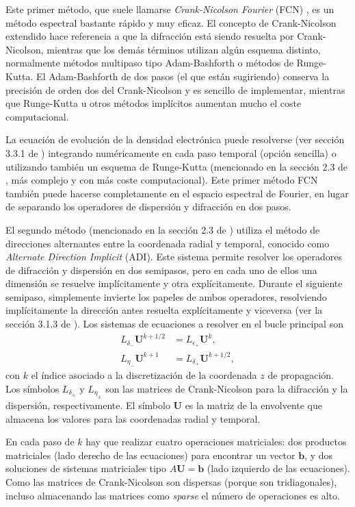 \documentclass{scrartcl} %
\begin{document}
Este primer método, que suele llamarse \emph{Crank-Nicolson Fourier} (FCN) \cite{Couairon2007}, es un método espectral bastante rápido y muy eficaz. El concepto de Crank-Nicolson extendido hace referencia a que la difracción está siendo resuelta por Crank-Nicolson, mientras que los demás términos utilizan algún esquema distinto, normalmente métodos multipaso tipo Adam-Bashforth o métodos de Runge-Kutta. El Adam-Bashforth de dos pasos (el que están sugiriendo) conserva la precisión de orden dos del Crank-Nicolson y es sencillo de implementar, mientras que Runge-Kutta u otros métodos implícitos aumentan mucho el coste computacional.

La ecuación de evolución de la densidad electrónica puede resolverse (ver sección 3.3.1 de \cite{Couairon2011}) integrando numéricamente en cada paso temporal (opción sencilla) o utilizando también un esquema de Runge-Kutta (mencionado en la sección 2.3 de \cite{Couairon2007}, más complejo y con más coste computacional). Este primer método FCN también puede hacerse completamente en el espacio espectral de Fourier, en lugar de separando los operadores de dispersión y difracción en dos pasos.

El segundo método (mencionado en la sección 2.3 de \cite{Couairon2007}) utiliza el método de direcciones alternantes entre la coordenada radial y temporal, conocido como \emph{Alternate Direction Implicit} (ADI). Este sistema permite resolver los operadores de difracción y dispersión en dos semipasos, pero en cada uno de ellos una dimensión se resuelve implícitamente y otra explícitamente. Durante el siguiente semipaso, simplemente invierte los papeles de ambos operadores, resolviendo implícitamente la dirección antes resuelta explícitamente y viceversa (ver la sección 3.1.3 de \cite{Couairon2011}). Los sistemas de ecuaciones a resolver en el bucle principal son
\begin{align}
  L_{\delta_{-}}\symbf{U}^{k + 1/2} & = L_{\epsilon_{+}}\symbf{U}^{k}, \label{eq:50} \\
  L_{\eta_{-}}\symbf{U}^{k + 1} & = L_{\delta_{+}}\symbf{U}^{k + 1/2}, \label{eq:51}
\end{align}
con $k$ el índice asociado a la discretización de la coordenada $z$ de propagación. Los símbolos $L_{\delta_{\pm}}$ y $L_{\eta_{\pm}}$ son las matrices de Crank-Nicolson para la difracción y la dispersión, respectivamente. El símbolo $\symbf{U}$ es la matriz de la envolvente que almacena los valores para las coordenadas radial y temporal.

En cada paso de $k$ hay que realizar cuatro operaciones matriciales: dos productos matriciales (lado derecho de las ecuaciones) para encontrar un vector $\symbf{b}$, y dos soluciones de sistemas matriciales tipo $A \symbf{U} = \symbf{b}$ (lado izquierdo de las ecuaciones). Como las matrices de Crank-Nicolson son dispersas (porque son tridiagonales), incluso almacenando las matrices como \emph{sparse} el número de operaciones es alto.
\end{document}

